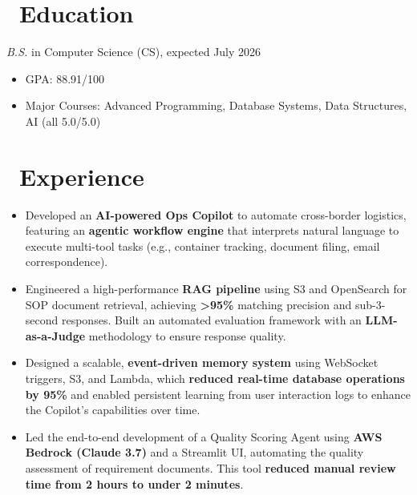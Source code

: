 \documentclass{resume}
\begin{document}



\section{\faGraduationCap\ Education}
\textit{B.S.} in Computer Science (CS), expected July 2026
\begin{itemize}
  \item GPA: 88.91/100
  \item Major Courses: Advanced Programming, Database Systems, Data Structures, AI (all 5.0/5.0)
\end{itemize}

\section{\faUsers\ Experience}

\begin{itemize}
    \item Developed an \textbf{AI-powered Ops Copilot} to automate cross-border logistics, featuring an \textbf{agentic workflow engine} that interprets natural language to execute multi-tool tasks (e.g., container tracking, document filing, email correspondence).
    \item Engineered a high-performance \textbf{RAG pipeline} using S3 and OpenSearch for SOP document retrieval, achieving \textbf{>95\%} matching precision and sub-3-second responses. Built an automated evaluation framework with an \textbf{LLM-as-a-Judge} methodology to ensure response quality.
    \item Designed a scalable, \textbf{event-driven memory system} using WebSocket triggers, S3, and Lambda, which \textbf{reduced real-time database operations by 95\%} and enabled persistent learning from user interaction logs to enhance the Copilot's capabilities over time.
    \item Led the end-to-end development of a Quality Scoring Agent using \textbf{AWS Bedrock (Claude 3.7)} and a Streamlit UI, automating the quality assessment of requirement documents. This tool \textbf{reduced manual review time from 2 hours to under 2 minutes}.
\end{itemize}
\end{document}
